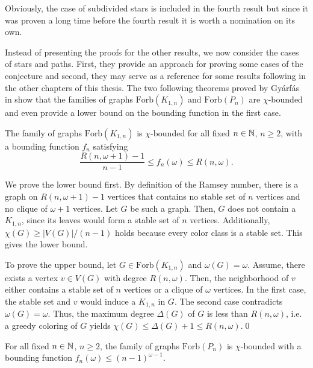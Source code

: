 Obviously, the case of subdivided stars is included in the fourth result but since it was proven a long time before the fourth result it is worth a nomination on its own.

Instead of presenting the proofs for the other results, we now consider the cases of stars and paths. First, they provide an approach for proving some cases of the conjecture and second, they may serve as a reference for some results following in the other chapters of this thesis. The two following theorems proved by Gyárfás in \cite{Gy87} show that the families of graphs $\text{Forb}(K_{1,n})$ and $\text{Forb}(P_n)$ are $\chi$-bounded and even provide a lower bound on the bounding function in the first case.

\begin{thm} The family of graphs $\text{Forb}(K_{1,n})$ is $\chi$-bounded for all fixed $n \in\mathbb{N}$, $n\geq 2$, with a bounding function $f_n$ satisfying \[\frac{R(n,\omega + 1) - 1}{n-1}\leq f_n(\omega )\leq R(n,\omega ).\] 
\end{thm}
\begin{prf}
We prove the lower bound first. By definition of the Ramsey number, there is a graph on $R(n,\omega + 1) - 1$ vertices that contains no stable set of $n$ vertices and no clique of $\omega + 1$ vertices. Let $G$ be such a graph. Then, $G$ does not contain a $K_{1,n}$, since its leaves would form a stable set of $n$ vertices. Additionally, $\chi (G)\geq |V(G)| /(n-1)$ holds because every color class is a stable set. This gives the lower bound.

To prove the upper bound, let $G \in\text{Forb} (K_{1,n})$ and $\omega (G) = \omega$. Assume, there exists a vertex $v\in V(G)$ with degree $R(n,\omega)$. Then, the neighborhood of $v$ either contains a stable set of $n$ vertices or a clique of $\omega$ vertices. In the first case, the stable set and $v$ would induce a $K_{1,n}$ in $G$. The second case contradicts $\omega (G) = \omega$. Thus, the maximum degree $\Delta (G)$ of $G$ is less than $R(n,\omega)$, i.e. a greedy coloring of $G$ yields $\chi (G)\leq\Delta (G) + 1\leq R(n,\omega)$.\qed
\end{prf}

\begin{thm}\label{t5cr}
For all fixed $n\in\mathbb{N}$, $n\geq 2$, the family of graphs $\text{Forb}(P_n)$ is $\chi$-bounded with a bounding function $f_n(\omega )\leq (n-1)^{\omega - 1}$.
\end{thm}

